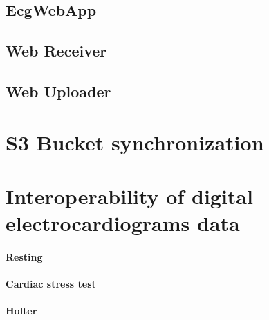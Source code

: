 \subsection{EcgWebApp}
\label{subsection:ecgwebapp}
\subsection{Web Receiver}
\label{subsection:webreceiver}
\subsection{Web Uploader}
\section{S3 Bucket synchronization}
\section{Interoperability of digital electrocardiograms data}
\paragraph{Resting}
\paragraph{Cardiac stress test}
\paragraph{Holter}





